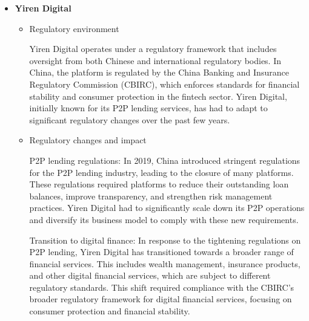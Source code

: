 \documentclass{article}
\begin{document}
\begin{itemize}
\begin{itemize}
        Impact of Brexit: The UK's departure from the EU (Brexit) has had significant regulatory implications for Funding Circle. The platform had to adjust to the new regulatory landscape, ensuring compliance with both UK-specific regulations and any applicable EU laws for its operations within the EU. This transition has required substantial legal and operational adjustments to maintain seamless service across different jurisdictions.
        
        Anti-Money Laundering (AML) and Know Your Customer (KYC) regulations: Funding Circle is also subject to AML and KYC regulations, which require the platform to implement rigorous checks to prevent financial crimes. These regulations mandate thorough verification of borrower and investor identities and continuous monitoring of transactions to detect and prevent suspicious activities \citep{hm_treasury_improving_2024}.

    \end{itemize}

    \item \textbf{Yiren Digital}
    \begin{itemize}
        \item Regulatory environment

        Yiren Digital operates under a regulatory framework that includes oversight from both Chinese and international regulatory bodies. In China, the platform is regulated by the China Banking and Insurance Regulatory Commission (CBIRC), which enforces standards for financial stability and consumer protection in the fintech sector. Yiren Digital, initially known for its P2P lending services, has had to adapt to significant regulatory changes over the past few years.

        \item Regulatory changes and impact

        P2P lending regulations: In 2019, China introduced stringent regulations for the P2P lending industry, leading to the closure of many platforms. These regulations required platforms to reduce their outstanding loan balances, improve transparency, and strengthen risk management practices. Yiren Digital had to significantly scale down its P2P operations and diversify its business model to comply with these new requirements.
        
        Transition to digital finance: In response to the tightening regulations on P2P lending, Yiren Digital has transitioned towards a broader range of financial services. This includes wealth management, insurance products, and other digital financial services, which are subject to different regulatory standards. This shift required compliance with the CBIRC's broader regulatory framework for digital financial services, focusing on consumer protection and financial stability.
        

\end{itemize}
\end{itemize}
\end{document}
